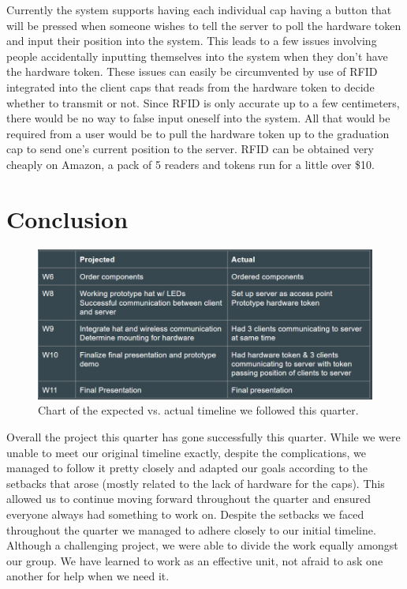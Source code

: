 \documentclass[a4paper,10pt]{article}
\begin{document}
Currently the system supports having each individual cap having a button that will be pressed when someone wishes to tell the server to poll the hardware token and input their position into the system. This leads to a few issues involving people accidentally inputting themselves into the system when they don't have the hardware token. These issues can easily be circumvented by use of RFID integrated into the client caps that reads from the hardware token to decide whether to transmit or not. Since RFID is only accurate up to a few centimeters, there would be no way to false input oneself into the system. All that would be required from a user would be to pull the hardware token up to the graduation cap to send one's current position to the server. RFID can be obtained very cheaply on Amazon, a pack of 5 readers and tokens run for a little over \$10. 

\section{Conclusion}
\begin{figure}[H]
  \centering
      \includegraphics[width=\textwidth]{Assets/Timeline.png}
  \caption{Chart of the expected vs. actual timeline we followed this quarter.}
\end{figure}
Overall the project this quarter has gone successfully this quarter. While we were unable to meet our original timeline exactly, despite the complications, we managed to follow it pretty closely and adapted our goals according to the setbacks that arose (mostly related to the lack of hardware for the caps). This allowed us to continue moving forward throughout the quarter and ensured everyone always had something to work on. Despite the setbacks we faced throughout the quarter we managed to adhere closely to our initial timeline. Although a challenging project, we were able to divide the work equally amongst our group. We have learned to work as an effective unit, not afraid to ask one another for help when we need it.
\end{document}
